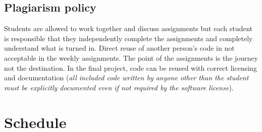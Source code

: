 \documentclass[12pt]{article}
\begin{document}
\subsection*{Plagiarism policy}
Students are allowed to work together and discuss assignments but each student is responsible that they independently complete the assignments and completely understand what is turned in. Direct reuse of another person's code in not acceptable in the weekly assignments. The point of the assignments is the journey not the destination. In the final project, code can be reused with correct licensing and documentation (\emph{all included code written by anyone other than the student must be explicitly documented even if not required by the software license}).

\section*{Schedule}
\newcommand\rownumber{\stepcounter{rownumbers}\arabic{rownumbers}}
\newcommand\assnumber{\stepcounter{assnumbers}\arabic{assnumbers}}
\end{document}
